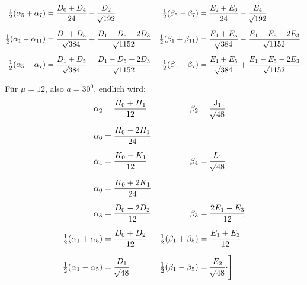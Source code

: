 \begin{landscape}
\[\begin{aligned}
\tfrac12(\alpha_5+\alpha_7)&=\frac{D_0+D_4}{24}-\frac{D_2}{\BareRoot{192}}&\tfrac12(\beta_5-\beta_7)&=\frac{E_2+E_6}{24}-\frac{E_4}{\BareRoot{192}}\\[6pt]
\tfrac12(\alpha_1-\alpha_{11})&=\frac{D_1+D_5}{\BareRoot{384}}+\frac{D_1-D_5+2D_3}{\BareRoot{1152}}&\tfrac12(\beta_1+\beta_{11})&=\frac{E_1+E_5}{\BareRoot{384}}-\frac{E_1-E_5-2E_3}{\BareRoot{1152}}\\[6pt]
\tfrac12(\alpha_5-\alpha_7)&=\frac{D_1+D_5}{\BareRoot{384}}-\frac{D_1-D_5+2D_3}{\BareRoot{1152}}&\tfrac12(\beta_5+\beta_7)&=\frac{E_1+E_5}{\BareRoot{384}}+\frac{E_1-E_5-2E_3}{\BareRoot{1152}}\VthreeRaisedPoint
\end{aligned}
\]
\clearpage{}
\par\noindent\hspace*{\parindent}Für \(\mu=12\), also \(a=30^0\), endlich wird:
\[
\begin{aligned}
\alpha_2&=\frac{H_0+H_1}{12}&\qquad\beta_2&=\frac{\mathrm{J}_1}{\BareRoot{48}}\\[6pt]
\alpha_6&=\frac{H_0-2H_1}{24}&&\\[6pt]
\alpha_4&=\frac{K_0-K_1}{12}&\beta_4&=\frac{L_1}{\BareRoot{48}}\\[6pt]
\alpha_0&=\frac{K_0+2K_1}{24}&&\\[6pt]
\alpha_3&=\frac{D_0-2D_2}{12}&\beta_3&=\frac{2E_1-E_3}{12}\VthreeFractionLowPoint\\[6pt]
\tfrac12(\alpha_1+\alpha_5)&=\frac{D_0+D_2}{12}&\tfrac12(\beta_1+\beta_5)&=\frac{E_1+E_3}{12}\\[6pt]
\tfrac12(\alpha_1-\alpha_5)&=\frac{D_1}{\BareRoot{48}}&\tfrac12(\beta_1-\beta_5)&=\frac{E_2}{\BareRoot{48}}\VthreeRaisedPoint\Bigg]
\end{aligned}
\]
\clearpage
\endgroup
\end{landscape}
